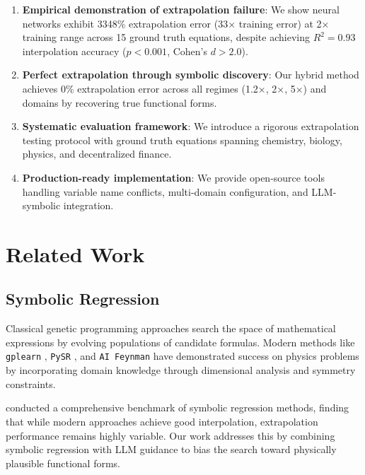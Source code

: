 \documentclass[twoside,11pt]{article}
\begin{document}
\begin{enumerate}
    \item \textbf{Empirical demonstration of extrapolation failure}: We show neural networks exhibit 3348\% extrapolation error (33× training error) at 2× training range across 15 ground truth equations, despite achieving $R^2 = 0.93$ interpolation accuracy ($p < 0.001$, Cohen's $d > 2.0$).

    \item \textbf{Perfect extrapolation through symbolic discovery}: Our hybrid method achieves 0\% extrapolation error across all regimes (1.2×, 2×, 5×) and domains by recovering true functional forms.

    \item \textbf{Systematic evaluation framework}: We introduce a rigorous extrapolation testing protocol with ground truth equations spanning chemistry, biology, physics, and decentralized finance.

    \item \textbf{Production-ready implementation}: We provide open-source tools handling variable name conflicts, multi-domain configuration, and LLM-symbolic integration.
\end{enumerate}

\section{Related Work}

\subsection{Symbolic Regression}

Classical genetic programming approaches \citep{koza1994genetic} search the space of mathematical expressions by evolving populations of candidate formulas. Modern methods like \texttt{gplearn} \citep{stephens2018gplearn}, \texttt{PySR} \citep{cranmer2023pysr}, and \texttt{AI Feynman} \citep{udrescu2020ai} have demonstrated success on physics problems by incorporating domain knowledge through dimensional analysis and symmetry constraints.

\citet{la2021contemporary} conducted a comprehensive benchmark of symbolic regression methods, finding that while modern approaches achieve good interpolation, extrapolation performance remains highly variable. Our work addresses this by combining symbolic regression with LLM guidance to bias the search toward physically plausible functional forms.
\end{document}
